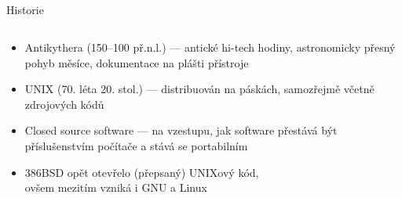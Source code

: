\documentclass{beamer}
\begin{document}
\subsection{}
\begin{frame}{Historie}
\begin{columns}
\begin{column}{9cm}
\begin{itemize}
\item Antikythera (150--100 př.n.l.) --- antické hi-tech hodiny, astronomicky přesný pohyb měsíce, dokumentace na plášti přístroje
\item UNIX (70. léta 20. stol.) --- distribuován na páskách, samozřejmě včetně zdrojových kódů
\item Closed source software --- na vzestupu, jak software přestává být příslušenstvím počítače a stává se portabilním
\item 386BSD opět otevřelo (přepsaný) UNIXový kód,\\ovšem mezitím vzniká i GNU a Linux
\end{itemize}
\end{column}
\end{columns}
\end{frame}
\end{document}

